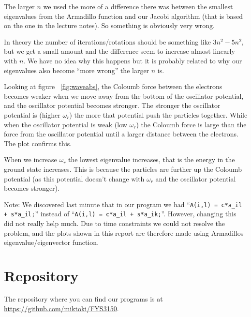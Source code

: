 \documentclass{article} %
\begin{document}
The larger $n$ we used the more of a difference there was between the smallest eigenvalues from the Armadillo function and our Jacobi algorithm (that is based on the one in the lecture notes). So something is obviously very wrong.

In theory the number of iterations/rotations should be something like $3n^2 - 5n^2$, but we get a small amount and the difference seem to increase almost linearly with $n$. We have no idea why this happens but it is probably related to why our eigenvalues also become ``more wrong'' the larger $n$ is.

Looking at figure ~\ref{fig:waveabs}, the Coloumb force between the electrons becomes weaker when we move away from the bottom of the oscillator potential, and the oscillator potential becomes stronger. The stronger the oscillator potential is (higher $\omega_r$) the more that potential push the particles together. While when the oscillator potential is weak (low $\omega_r$) the Coloumb force is large than the force from the oscillator potential until a larger distance between the electrons. The plot confirms this.

When we increase $\omega_r$ the lowest eigenvalue increases, that is the energy in the ground state increases. This is because the particles are further up the Coloumb potential (as this potential doesn't change with $\omega_r$ and the oscillator potential becomes stronger).

Note: We discovered last minute that in our program we had ``\texttt{A(i,l) = c*a\_il + s*a\_il;}'' instead of ``\texttt{A(i,l) = c*a\_il + s*a\_ik;}''. However, changing this did not really help much. Due to time constraints we could not resolve the problem, and the plots shown in this report are therefore made using Armadillos eigenvalue/eigenvector function. 

\section{Repository}
The repository where you can find our programs is at \url{https://github.com/miktoki/FYS3150}.

%
%

\end{document}
